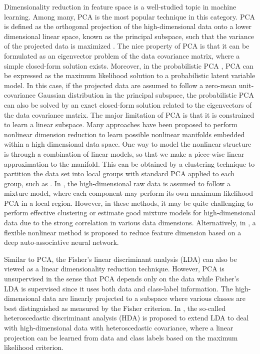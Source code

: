 \documentclass[11pt]{article}
\begin{document}
Dimensionality reduction in feature space is a well-studied topic in machine learning. Among many, PCA is the most popular technique in this category. PCA is defined as the orthogonal projection of the high-dimensional data onto a lower dimensional linear space, known as the principal subspace, such that the variance of the projected data is maximized \cite{Bishop_PRML_06}. The nice property of PCA is that it can be formulated as an eigenvector problem of the data covariance matrix, where a simple closed-form solution exists. Moreover, in the probabilistic PCA \cite{Tipping99b,Roweis98}, PCA can be expressed as the maximum likelihood solution to a probabilistic latent variable model. In this case, if the projected data are assumed to follow a zero-mean unit-covariance Gaussian distribution in the principal subspace, the probabilistic PCA can also be solved by an exact closed-form solution related to the eigenvectors of the data covariance matrix. The major limitation of PCA is that it is constrained to learn a linear subspace. Many approaches have been proposed to perform nonlinear dimension reduction to learn possible nonlinear manifolds embedded within a high dimensional data space. One way to model the nonlinear structure is through a combination of linear models, so that we make a piece-wise linear approximation to the manifold. This can be obtained by a clustering technique to partition the data set into local groups with standard PCA applied to each group, such as \cite{Hinton_1997,Kambhatla_1997,Tipping_1999}.  
In \cite{Tipping_1999}, the high-dimensional raw data is assumed to follow a mixture model, where each component may perform its own maximum likelihood PCA in a local region. However, in these methods, it may be quite challenging to perform effective clustering or estimate good mixture models for high-dimensional data due to the strong correlation in various data dimensions. Alternatively, in \cite{Hinton_2006}, a flexible nonlinear method is proposed to reduce feature dimension based on a deep auto-associative neural network. 

Similar to PCA, the Fisher's linear discriminant analysis (LDA) can also be viewed as a linear dimensionality reduction technique. However, PCA is unsupervised in the sense that PCA depends only on the data while Fisher's LDA is supervised since it uses both data and  class-label information. The high-dimensional data are linearly projected to a subspace where various classes are best distinguished as measured by the Fisher criterion. In \cite{Kumar98}, the so-called heteroscedastic discriminant analysis (HDA) is proposed to extend LDA to deal with high-dimensional data with heteroscedastic covariance, where a linear projection can be learned from data and class labels based on the maximum likelihood criterion. 
\end{document}
